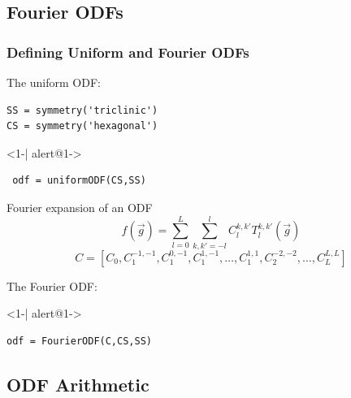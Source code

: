 \subsection*{Fourier ODFs}

\begin{frame}[fragile]
  \frametitle{Defining Uniform and  Fourier ODFs}

  The uniform ODF:
\begin{lstlisting}
SS = symmetry('triclinic')
CS = symmetry('hexagonal')
\end{lstlisting}

  \begin{actionenv}<1-| alert@1->
\begin{lstlisting}
 odf = uniformODF(CS,SS)
\end{lstlisting}
  \end{actionenv}

  \begin{block}{Fourier expansion of an ODF}
    \begin{equation*}
      f(\vec g) = \sum_{l=0}^L \sum_{k,k'=-l}^l C_l^{k,k'} T_l^{k,k'}(\vec g)
    \end{equation*}
    \begin{equation*}
      C = [C_0,C_1^{-1,-1},C_1^{0,-1},C_1^{1,-1},\ldots,C_1^{1,1},C_2^{-2,-2},\ldots,C_L^{L,L}]
    \end{equation*}
  \end{block}
The Fourier ODF:
  \begin{actionenv}<1-| alert@1->
\begin{lstlisting}
odf = FourierODF(C,CS,SS)
\end{lstlisting}
  \end{actionenv}



\end{frame}

\subsection*{ODF Arithmetic}

